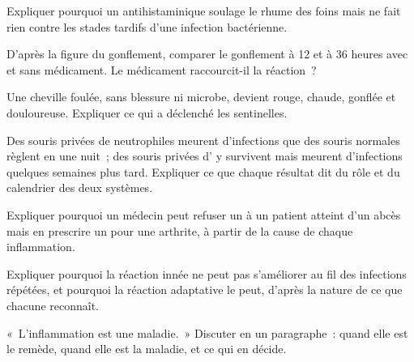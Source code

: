 \begin{exercise}[$\star\star$]\label{exo:g12:innate-immunity:9}
Expliquer pourquoi un antihistaminique soulage le rhume des foins mais
ne fait rien contre les stades tardifs d'une infection bactérienne.
\end{exercise}

\begin{exercise}[$\star\star$]\label{exo:g12:innate-immunity:10}
D'après la figure du gonflement, comparer le gonflement à 12 et à 36
heures avec et sans médicament. Le médicament raccourcit-il la
réaction~?
\end{exercise}

\begin{exercise}[$\star\star$]\label{exo:g12:innate-immunity:11}
Une cheville foulée, sans blessure ni microbe, devient rouge, chaude,
gonflée et douloureuse. Expliquer ce qui a déclenché les 
sentinelles.
\end{exercise}

\begin{exercise}[$\star\star\star$]\label{exo:g12:innate-immunity:12}
Des souris privées de neutrophiles meurent d'infections que des souris
normales règlent en une nuit~; des souris privées d' y survivent mais meurent d'infections quelques semaines
plus tard. Expliquer ce que chaque résultat dit du rôle et du
calendrier des deux systèmes.
\end{exercise}

\begin{exercise}[$\star\star\star$]\label{exo:g12:innate-immunity:13}
Expliquer pourquoi un médecin peut refuser un  à un
patient atteint d'un abcès mais en prescrire un pour une arthrite, à
partir de la cause de chaque inflammation.
\end{exercise}

\begin{exercise}[$\star\star\star$]\label{exo:g12:innate-immunity:14}
Expliquer pourquoi la réaction innée ne peut pas s'améliorer au fil
des infections répétées, et pourquoi la réaction adaptative le peut,
d'après la nature de ce que chacune reconnaît.
\end{exercise}

\begin{exercise}[$\star\star\star$]\label{exo:g12:innate-immunity:15}
«~L'inflammation est une maladie.~» Discuter en un paragraphe~: quand
elle est le remède, quand elle est la maladie, et ce qui en décide.
\end{exercise}

